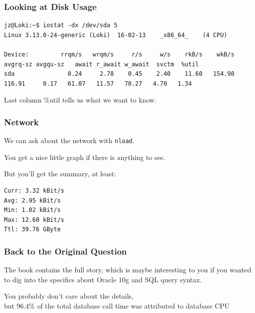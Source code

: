 \begin{frame}[fragile]
\frametitle{Looking at Disk Usage}

{\tiny
\begin{verbatim}
jz@Loki:~$ iostat -dx /dev/sda 5 
Linux 3.13.0-24-generic (Loki) 	16-02-13 	_x86_64_	(4 CPU)

Device:         rrqm/s   wrqm/s     r/s     w/s    rkB/s    wkB/s avgrq-sz avgqu-sz   await r_await w_await  svctm  %util
sda               0.24     2.78    0.45    2.40    11.60   154.98   116.91     0.17   61.07   11.57   70.27   4.70   1.34
\end{verbatim}
}

\large
\begin{changemargin}{1cm}
Last column \%util tells us what we want to know.
\end{changemargin}

\end{frame}



\begin{frame}[fragile]
\frametitle{Network}

\large
\begin{changemargin}{1cm}
We can ask about the network with \texttt{nload}. 
 
You get a nice little graph if there is anything to see. 

But you'll get the summary, at least:

\begin{verbatim}
Curr: 3.32 kBit/s
Avg: 2.95 kBit/s
Min: 1.02 kBit/s
Max: 12.60 kBit/s
Ttl: 39.76 GByte                                                                                       \end{verbatim}
\end{changemargin}
\end{frame}



\begin{frame}
\frametitle{Back to the Original Question}

\large
\begin{changemargin}{1cm}
The book contains the full story, which is maybe interesting to you if you wanted to dig into the specifics about Oracle 10g and SQL query syntax. 

You probably don't care about the details, \\
but 96.4\% of the total database call time was attributed to database CPU
\end{changemargin}

\end{frame}



